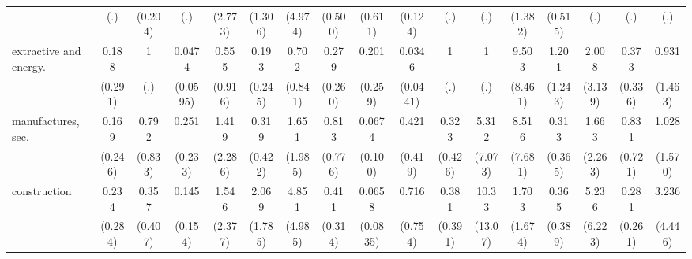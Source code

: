 {\begin{tabular}{l*{16}{c}}
                    &         (.)         &     (0.204)         &         (.)         &     (2.773)         &     (1.306)         &     (4.974)         &     (0.500)         &     (0.611)         &     (0.124)         &         (.)         &         (.)         &     (1.382)         &     (0.515)         &         (.)         &         (.)         &         (.)         \\
[1em]
extractive and energy.&       0.188         &           1         &      0.0474\sym{*}  &       0.555         &       0.193         &       0.702         &       0.279         &       0.201         &      0.0346\sym{**} &           1         &           1         &       9.503\sym{*}  &       1.201         &       2.008         &       0.373         &       0.931         \\
                    &     (0.291)         &         (.)         &    (0.0595)         &     (0.916)         &     (0.245)         &     (0.841)         &     (0.260)         &     (0.259)         &    (0.0441)         &         (.)         &         (.)         &     (8.461)         &     (1.243)         &     (3.139)         &     (0.336)         &     (1.463)         \\
[1em]
manufactures, sec.  &       0.169         &       0.792         &       0.251         &       1.419         &       0.319         &       1.651         &       0.813         &      0.0674         &       0.421         &       0.323         &       5.312         &       8.516\sym{*}  &       0.313         &       1.663         &       0.831         &       1.028         \\
                    &     (0.246)         &     (0.833)         &     (0.233)         &     (2.286)         &     (0.422)         &     (1.985)         &     (0.776)         &     (0.100)         &     (0.419)         &     (0.426)         &     (7.073)         &     (7.681)         &     (0.365)         &     (2.263)         &     (0.721)         &     (1.570)         \\
[1em]
construction        &       0.234         &       0.357         &       0.145         &       1.546         &       2.069         &       4.851         &       0.411         &      0.0658\sym{*}  &       0.716         &       0.381         &       10.33         &       1.703         &       0.365         &       5.236         &       0.281         &       3.236         \\
                    &     (0.284)         &     (0.407)         &     (0.154)         &     (2.377)         &     (1.785)         &     (4.985)         &     (0.314)         &    (0.0835)         &     (0.754)         &     (0.391)         &     (13.07)         &     (1.674)         &     (0.389)         &     (6.223)         &     (0.261)         &     (4.446)         \\

\end{tabular}}
